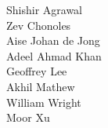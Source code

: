 Shishir Agrawal\\
Zev Chonoles\\
Aise Johan de Jong\\
Adeel Ahmad Khan\\
Geoffrey Lee\\
Akhil Mathew\\
William Wright\\
Moor Xu\\
